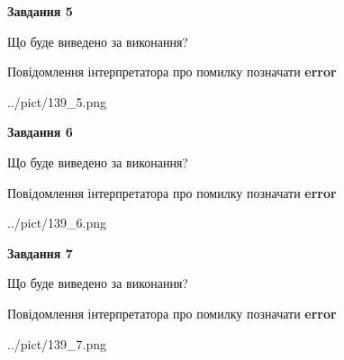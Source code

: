 \documentclass[10pt, ukrainian]{article}
\begin{document}
{\begin {large}
{\begin {center}\textbf{Завдання 5}\end {center}}\par
Що буде виведено за виконання? \par
Повідомлення інтерпретатора про помилку позначати \textbf{error}

\begin{center}
	{../pict/139_5.png}
\end{center}
\newpage

{\begin {center}\textbf{Завдання 6}\end {center}}\par
Що буде виведено за виконання? \par
Повідомлення інтерпретатора про помилку позначати \textbf{error}

\begin{center}
	{../pict/139_6.png}
\end{center}
\newpage

{\begin {center}\textbf{Завдання 7}\end {center}}\par
Що буде виведено за виконання? \par
Повідомлення інтерпретатора про помилку позначати \textbf{error}

\begin{center}
	{../pict/139_7.png}
\end{center}
\newpage

\end {large}}
\end{document}

